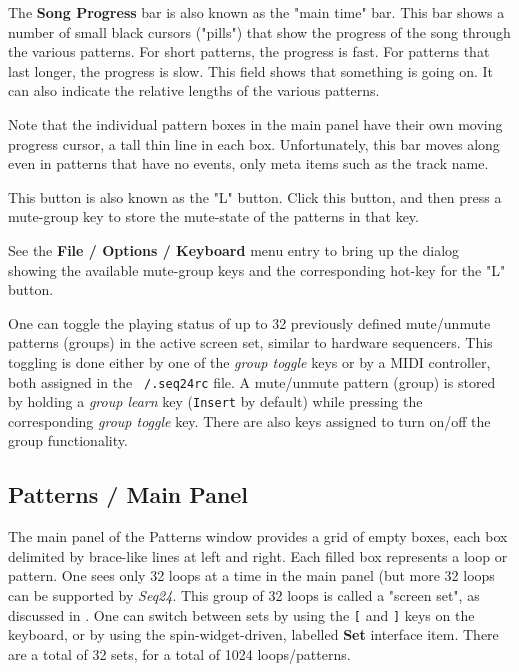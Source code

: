    \setcounter{ItemCounter}{0}      %

   The \textbf{Song Progress} bar is also known as the "main time" bar.
   This bar shows a number of small black cursors ("pills") that show the
   progress of the song through the various patterns.  For short patterns,
   the progress is fast.  For patterns that last longer, the progress is
   slow.  This field shows that something is going on.  It can also indicate
   the relative lengths of the various patterns.
 
   Note that the individual pattern boxes in the main panel have their own
   moving progress cursor, a tall thin line in each box.  Unfortunately,
   this bar moves along even in patterns that have no events, only meta
   items such as the track name.

   This button is also known as the "L" button.
   Click this button, and then press a mute-group key
   to store the mute-state of the patterns in that key.

   See the \textbf{File / Options / Keyboard} menu entry to bring up the
   dialog showing the available mute-group keys and the corresponding
   hot-key for the "L" button.

	One can toggle the playing status of up to 32 previously
	defined mute/unmute patterns (groups) in the active screen
	set, similar to hardware sequencers.
	This toggling is done either by one of the \textsl{group toggle} keys
	or by a MIDI controller, both assigned in the
   \texttt{~/.seq24rc} file.
	A mute/unmute pattern (group) is stored by holding a
   \textsl{group learn} key (\texttt{Insert} by default) while pressing the
   corresponding \textsl{group toggle} key.
	There are also keys assigned to turn on/off the group
	functionality.

\subsection{Patterns / Main Panel}
\label{subsec:seq24_patterns_panel_main}

   The main panel of the Patterns window provides a grid of empty boxes,
   each box delimited by brace-like lines at left and right.
   Each filled box represents a loop or pattern.
   One sees only 32 loops at a time in the main panel (but more 32
   loops can be supported by \textsl{Seq24}.
   This group of 32 loops is called a "screen set", as discussed in
   .
   One can switch between sets
   by using the
   \index{keys![}
   \texttt{[} and
   \index{keys!]}
   \texttt{]} keys on the keyboard, or by using
   the spin-widget-driven, labelled \textbf{Set} interface item.
   There are a total of 32 sets, for a total of
   1024 loops/patterns. 

